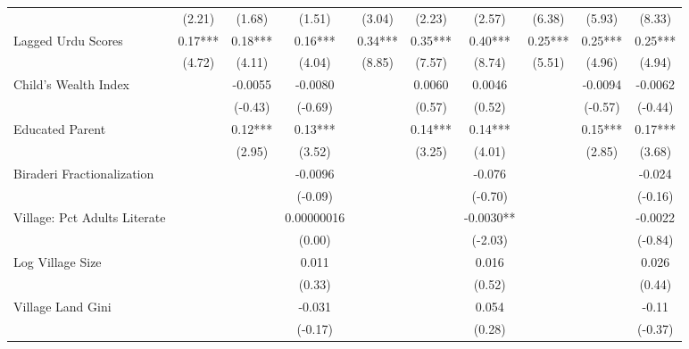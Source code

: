 \begin{sidewaystable}[htbp]
\begin{tabular}{l*{9}{c}}
                &   (2.21)   &   (1.68)   &   (1.51)   &   (3.04)   &   (2.23)   &   (2.57)   &   (6.38)   &   (5.93)   &   (8.33)   \\
Lagged Urdu Scores&     0.17***&     0.18***&     0.16***&     0.34***&     0.35***&     0.40***&     0.25***&     0.25***&     0.25***\\
                &   (4.72)   &   (4.11)   &   (4.04)   &   (8.85)   &   (7.57)   &   (8.74)   &   (5.51)   &   (4.96)   &   (4.94)   \\
Child's Wealth Index&            &  -0.0055   &  -0.0080   &            &   0.0060   &   0.0046   &            &  -0.0094   &  -0.0062   \\
                &            &  (-0.43)   &  (-0.69)   &            &   (0.57)   &   (0.52)   &            &  (-0.57)   &  (-0.44)   \\
Educated Parent &            &     0.12***&     0.13***&            &     0.14***&     0.14***&            &     0.15***&     0.17***\\
                &            &   (2.95)   &   (3.52)   &            &   (3.25)   &   (4.01)   &            &   (2.85)   &   (3.68)   \\
Biraderi Fractionalization&            &            &  -0.0096   &            &            &   -0.076   &            &            &   -0.024   \\
                &            &            &  (-0.09)   &            &            &  (-0.70)   &            &            &  (-0.16)   \\
Village: Pct Adults Literate&            &            &0.00000016   &            &            &  -0.0030** &            &            &  -0.0022   \\
                &            &            &   (0.00)   &            &            &  (-2.03)   &            &            &  (-0.84)   \\
Log Village Size&            &            &    0.011   &            &            &    0.016   &            &            &    0.026   \\
                &            &            &   (0.33)   &            &            &   (0.52)   &            &            &   (0.44)   \\
Village Land Gini&            &            &   -0.031   &            &            &    0.054   &            &            &    -0.11   \\
                &            &            &  (-0.17)   &            &            &   (0.28)   &            &            &  (-0.37)   \\

\end{tabular}
\end{sidewaystable}
